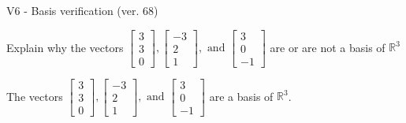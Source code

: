 \begin{exercise}
  \begin{exerciseTitle}V6 - Basis verification (ver. 68)\end{exerciseTitle}
  \begin{exerciseStatement}
    Explain why the vectors \(\left[\begin{array}{r}
3 \\
3 \\
0
\end{array}\right] , \left[\begin{array}{r}
-3 \\
2 \\
1
\end{array}\right] , \text{ and } \left[\begin{array}{r}
3 \\
0 \\
-1
\end{array}\right]\) are or are not a basis of \(\mathbb{R}^3\)	


  \end{exerciseStatement}
  \begin{exerciseAnswer}
   The vectors \(\left[\begin{array}{r}
3 \\
3 \\
0
\end{array}\right] , \left[\begin{array}{r}
-3 \\
2 \\
1
\end{array}\right] , \text{ and } \left[\begin{array}{r}
3 \\
0 \\
-1
\end{array}\right]\) 
  	 are  a basis of \(\mathbb{R}^3\).
  


  \end{exerciseAnswer}
\end{exercise}